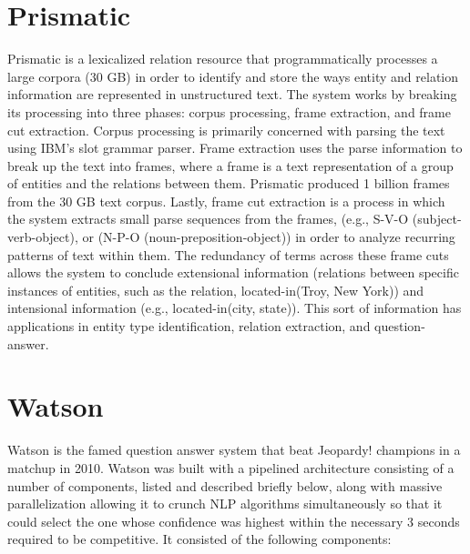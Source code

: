 \section{Prismatic}

Prismatic \cite{fan2012automatic} is a lexicalized relation resource that programmatically processes
a large corpora (30 GB) in order to identify and store the ways entity and relation information
are represented in unstructured text.  The system works by breaking its processing into
three phases:  corpus processing, frame extraction, and frame cut extraction.  Corpus
processing is primarily concerned with parsing the text using IBM's slot grammar parser.
Frame extraction uses the parse information to break up the text into frames, where a frame
is a text representation of a group of entities and the relations between them.  Prismatic 
produced 1 billion frames from the 30 GB text corpus.  Lastly, frame cut extraction is a process
in which the system extracts small parse sequences from the frames, (e.g., S-V-O (subject-verb-object), or
(N-P-O (noun-preposition-object)) in order to analyze recurring patterns of text within them.  
The redundancy
of terms across these frame cuts allows the system to conclude extensional information 
(relations between specific instances of entities, such
as the relation, located-in(Troy, New York)) and intensional information (e.g., located-in(city, state)). 
This sort of 
information has applications in entity type identification, relation extraction, 
and question-answer.

\section{Watson}

Watson \cite{ferrucci2010building} is the famed question answer system that beat Jeopardy! champions in a matchup in 2010.
Watson was built with a pipelined architecture consisting of a number of components, listed and described
briefly below, along with massive parallelization allowing it to crunch NLP algorithms simultaneously so that it could select the one whose confidence was highest within the necessary 3 seconds required to be
competitive.  It consisted of the following components:

